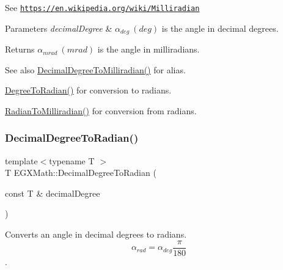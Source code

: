 See \href{https://en.wikipedia.org/wiki/Milliradian}{\tt https\+://en.\+wikipedia.\+org/wiki/\+Milliradian} 
\begin{DoxyParams}{Parameters}
{\em decimal\+Degree} & $\alpha_{deg}\ (deg)$ is the angle in decimal degrees. \\
\hline
\end{DoxyParams}
\begin{DoxyReturn}{Returns}
$\alpha_{mrad}\ (mrad)$ is the angle in milliradians. 
\end{DoxyReturn}
\begin{DoxySeeAlso}{See also}
\mbox{\hyperlink{group___e_g_x_math-_angle_conversions-_decimal_degree_gab567d02d4692d9642a4ad219e479713a}{Decimal\+Degree\+To\+Milliradian()}} for alias. 

\mbox{\hyperlink{group___e_g_x_math-_angle_conversions-_degree_ga48585541b228c852c9d08a9eac3682f0}{Degree\+To\+Radian()}} for conversion to radians. 

\mbox{\hyperlink{group___e_g_x_math-_angle_conversions-_radian_gaea391f0cca39b05e298dd1cae162e7f1}{Radian\+To\+Milliradian()}} for conversion from radians. 
\end{DoxySeeAlso}
\mbox{\label{group___e_g_x_math-_angle_conversions-_decimal_degree_ga906ee2c83cdf4caa59eb613dc2d5d52a}} 
\subsubsection{\texorpdfstring{Decimal\+Degree\+To\+Radian()}{DecimalDegreeToRadian()}}
{\footnotesize\ttfamily template$<$typename T $>$ \\
T E\+G\+X\+Math\+::\+Decimal\+Degree\+To\+Radian (\begin{DoxyParamCaption}\item[{const T \&}]{decimal\+Degree }\end{DoxyParamCaption})}



Converts an angle in decimal degrees to radians. \[\alpha_{rad}=\alpha_{deg}\frac{\pi}{180}\]. 

